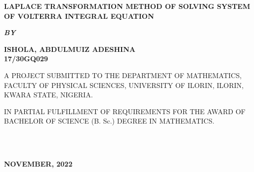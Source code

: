 \documentclass[11pt]{report}
\newcommand{\bt}[1]{\textbf{#1}}
\begin{document}
	
	\clearpage
	\thispagestyle{empty}
	\begin{center}
		\Large \bt{LAPLACE TRANSFORMATION METHOD OF SOLVING SYSTEM OF VOLTERRA INTEGRAL EQUATION}
	\end{center}

	\hspace{7cm}
	
	\begin{center}
		\textbf{\textit{BY}}
	\end{center}
	
	\hspace{5cm}
	
	\begin{center}
		\large \textbf{ISHOLA, ABDULMUIZ ADESHINA
			\\
			17/30GQ029}
	\end{center}
	
	\hspace{9cm}
	
	\begin{center}
		A PROJECT SUBMITTED TO THE DEPARTMENT OF MATHEMATICS, FACULTY OF PHYSICAL SCIENCES, UNIVERSITY OF ILORIN, ILORIN, KWARA STATE, NIGERIA.
	\end{center}

	\hspace{7cm}
	
	\begin{center}
		IN PARTIAL FULFILLMENT OF REQUIREMENTS FOR THE AWARD OF BACHELOR OF SCIENCE (B. Sc.) DEGREE IN MATHEMATICS.
	\end{center}
	\hspace{5cm}
	\\ \\ 
	\begin{center}
		\textbf{NOVEMBER, 2022}
	\end{center}

	\newpage
\end{document}
